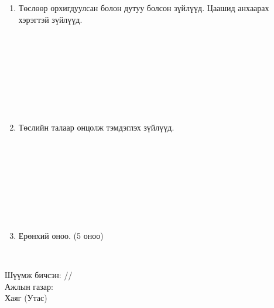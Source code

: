 \begin{titlepage}
\begin{enumerate}
\begin{center}
\dotfill \\[0.1cm]
\dotfill \\[0.1cm]
\dotfill \\[0.1cm]
\dotfill \\[0.1cm]
\dotfill \\[0.1cm]
\dotfill \\[0.1cm]
\dotfill \\[0.4cm]
\end{center}
\item Төслөөр орхигдуулсан болон дутуу болсон зүйлүүд. Цаашид анхаарах хэрэгтэй зүйлүүд.
\begin{center}
\dotfill \\[0.1cm]
\dotfill \\[0.1cm]
\dotfill \\[0.1cm]
\dotfill \\[0.1cm]
\dotfill \\[0.1cm]
\dotfill \\[0.1cm]
\dotfill \\[0.4cm]
\end{center}
\item Төслийн талаар онцолж тэмдэглэх зүйлүүд.
\begin{center}
\dotfill \\[0.1cm]
\dotfill \\[0.1cm]
\dotfill \\[0.1cm]
\dotfill \\[0.1cm]
\dotfill \\[0.1cm]
\dotfill \\[0.1cm]
\dotfill \\[0.4cm]
\end{center}
\item Ерөнхий оноо. (5 оноо)
\begin{center}
\dotfill \\[1cm]
\end{center}
\end{enumerate}
Шүүмж бичсэн: \makebox[3cm]{\dotfill} /\readname/ \\[0.5cm]
Ажлын газар: \dotfill \\[0.5cm]
Хаяг (Утас) \makebox[5cm]{\dotfill}
\end{titlepage}
